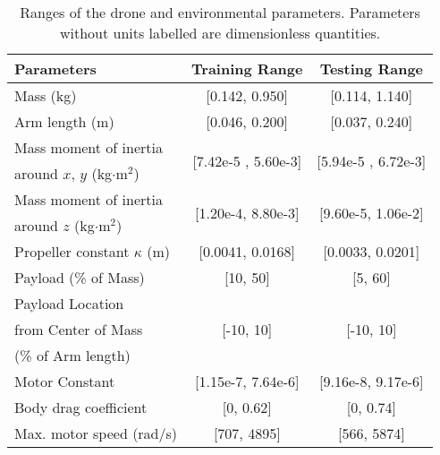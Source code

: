   
\begin{table}[t]
\setlength{\tabcolsep}{5.5pt}
\begin{center}
\begin{tabular}{lcc}
\toprule
 \textbf{Parameters} & \textbf{Training Range} & \textbf{Testing Range} \\
 \midrule
 Mass (kg) & [0.142, 0.950]  & [0.114, 1.140]  \\
 Arm length (m) & [0.046, 0.200] & [0.037, 0.240] \\
 Mass moment of inertia  & \multirow{2}{*}{ [7.42e-5 , 5.60e-3]}&\multirow{2}{*}{ [5.94e-5 , 6.72e-3]} \\
 around $x$, $y$ (kg$\cdot$m$^2$)&&\\
  Mass moment of inertia  & \multirow{2}{*}{[1.20e-4, 8.80e-3]} &  \multirow{2}{*}{[9.60e-5, 1.06e-2]} \\
  around $z$ (kg$\cdot$m$^2$)&&\\
 Propeller constant $\kappa$ (m) & [0.0041, 0.0168] & [0.0033, 0.0201]\\
 Payload (\% of Mass)  & [10, 50] & [5, 60] \\
 Payload Location & \multirow{3}{*}{[-10, 10]}  & \multirow{3}{*}{[-10, 10]}  \\
 from Center of Mass&&\\
 (\% of Arm length)&&\\
 Motor Constant & [1.15e-7, 7.64e-6] & [9.16e-8, 9.17e-6]  \\
 Body drag coefficient & [0, 0.62]& [0, 0.74] \\
 Max. motor speed (rad/s) & [707, 4895] & [566, 5874] \\
\bottomrule
\end{tabular}
\vspace{1ex}
\caption{\label{tab:randomization} Ranges of the drone and environmental parameters. Parameters without units labelled are dimensionless quantities.}
\end{center}
\end{table}



